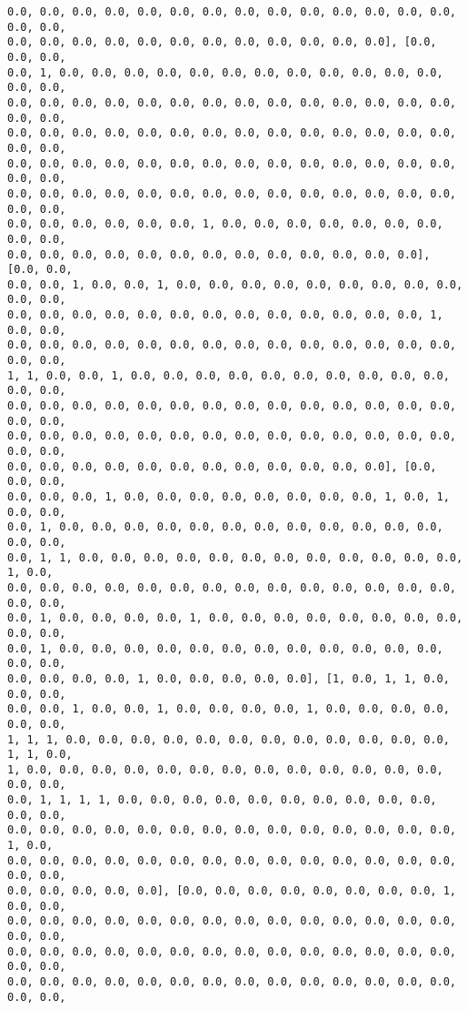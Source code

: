 \documentclass[11pt]{article}
\begin{document}
\begin{Verbatim}[commandchars=\\\{\}]
0.0, 0.0, 0.0, 0.0, 0.0, 0.0, 0.0, 0.0, 0.0, 0.0, 0.0, 0.0, 0.0, 0.0, 0.0, 0.0,
0.0, 0.0, 0.0, 0.0, 0.0, 0.0, 0.0, 0.0, 0.0, 0.0, 0.0, 0.0], [0.0, 0.0, 0.0,
0.0, 1, 0.0, 0.0, 0.0, 0.0, 0.0, 0.0, 0.0, 0.0, 0.0, 0.0, 0.0, 0.0, 0.0, 0.0,
0.0, 0.0, 0.0, 0.0, 0.0, 0.0, 0.0, 0.0, 0.0, 0.0, 0.0, 0.0, 0.0, 0.0, 0.0, 0.0,
0.0, 0.0, 0.0, 0.0, 0.0, 0.0, 0.0, 0.0, 0.0, 0.0, 0.0, 0.0, 0.0, 0.0, 0.0, 0.0,
0.0, 0.0, 0.0, 0.0, 0.0, 0.0, 0.0, 0.0, 0.0, 0.0, 0.0, 0.0, 0.0, 0.0, 0.0, 0.0,
0.0, 0.0, 0.0, 0.0, 0.0, 0.0, 0.0, 0.0, 0.0, 0.0, 0.0, 0.0, 0.0, 0.0, 0.0, 0.0,
0.0, 0.0, 0.0, 0.0, 0.0, 0.0, 1, 0.0, 0.0, 0.0, 0.0, 0.0, 0.0, 0.0, 0.0, 0.0,
0.0, 0.0, 0.0, 0.0, 0.0, 0.0, 0.0, 0.0, 0.0, 0.0, 0.0, 0.0, 0.0], [0.0, 0.0,
0.0, 0.0, 1, 0.0, 0.0, 1, 0.0, 0.0, 0.0, 0.0, 0.0, 0.0, 0.0, 0.0, 0.0, 0.0, 0.0,
0.0, 0.0, 0.0, 0.0, 0.0, 0.0, 0.0, 0.0, 0.0, 0.0, 0.0, 0.0, 0.0, 1, 0.0, 0.0,
0.0, 0.0, 0.0, 0.0, 0.0, 0.0, 0.0, 0.0, 0.0, 0.0, 0.0, 0.0, 0.0, 0.0, 0.0, 0.0,
1, 1, 0.0, 0.0, 1, 0.0, 0.0, 0.0, 0.0, 0.0, 0.0, 0.0, 0.0, 0.0, 0.0, 0.0, 0.0,
0.0, 0.0, 0.0, 0.0, 0.0, 0.0, 0.0, 0.0, 0.0, 0.0, 0.0, 0.0, 0.0, 0.0, 0.0, 0.0,
0.0, 0.0, 0.0, 0.0, 0.0, 0.0, 0.0, 0.0, 0.0, 0.0, 0.0, 0.0, 0.0, 0.0, 0.0, 0.0,
0.0, 0.0, 0.0, 0.0, 0.0, 0.0, 0.0, 0.0, 0.0, 0.0, 0.0, 0.0], [0.0, 0.0, 0.0,
0.0, 0.0, 0.0, 1, 0.0, 0.0, 0.0, 0.0, 0.0, 0.0, 0.0, 0.0, 1, 0.0, 1, 0.0, 0.0,
0.0, 1, 0.0, 0.0, 0.0, 0.0, 0.0, 0.0, 0.0, 0.0, 0.0, 0.0, 0.0, 0.0, 0.0, 0.0,
0.0, 1, 1, 0.0, 0.0, 0.0, 0.0, 0.0, 0.0, 0.0, 0.0, 0.0, 0.0, 0.0, 0.0, 1, 0.0,
0.0, 0.0, 0.0, 0.0, 0.0, 0.0, 0.0, 0.0, 0.0, 0.0, 0.0, 0.0, 0.0, 0.0, 0.0, 0.0,
0.0, 1, 0.0, 0.0, 0.0, 0.0, 1, 0.0, 0.0, 0.0, 0.0, 0.0, 0.0, 0.0, 0.0, 0.0, 0.0,
0.0, 1, 0.0, 0.0, 0.0, 0.0, 0.0, 0.0, 0.0, 0.0, 0.0, 0.0, 0.0, 0.0, 0.0, 0.0,
0.0, 0.0, 0.0, 0.0, 1, 0.0, 0.0, 0.0, 0.0, 0.0], [1, 0.0, 1, 1, 0.0, 0.0, 0.0,
0.0, 0.0, 1, 0.0, 0.0, 1, 0.0, 0.0, 0.0, 0.0, 1, 0.0, 0.0, 0.0, 0.0, 0.0, 0.0,
1, 1, 1, 0.0, 0.0, 0.0, 0.0, 0.0, 0.0, 0.0, 0.0, 0.0, 0.0, 0.0, 0.0, 1, 1, 0.0,
1, 0.0, 0.0, 0.0, 0.0, 0.0, 0.0, 0.0, 0.0, 0.0, 0.0, 0.0, 0.0, 0.0, 0.0, 0.0,
0.0, 1, 1, 1, 1, 0.0, 0.0, 0.0, 0.0, 0.0, 0.0, 0.0, 0.0, 0.0, 0.0, 0.0, 0.0,
0.0, 0.0, 0.0, 0.0, 0.0, 0.0, 0.0, 0.0, 0.0, 0.0, 0.0, 0.0, 0.0, 0.0, 1, 0.0,
0.0, 0.0, 0.0, 0.0, 0.0, 0.0, 0.0, 0.0, 0.0, 0.0, 0.0, 0.0, 0.0, 0.0, 0.0, 0.0,
0.0, 0.0, 0.0, 0.0, 0.0], [0.0, 0.0, 0.0, 0.0, 0.0, 0.0, 0.0, 0.0, 1, 0.0, 0.0,
0.0, 0.0, 0.0, 0.0, 0.0, 0.0, 0.0, 0.0, 0.0, 0.0, 0.0, 0.0, 0.0, 0.0, 0.0, 0.0,
0.0, 0.0, 0.0, 0.0, 0.0, 0.0, 0.0, 0.0, 0.0, 0.0, 0.0, 0.0, 0.0, 0.0, 0.0, 0.0,
0.0, 0.0, 0.0, 0.0, 0.0, 0.0, 0.0, 0.0, 0.0, 0.0, 0.0, 0.0, 0.0, 0.0, 0.0, 0.0,

\end{Verbatim}
\end{document}
